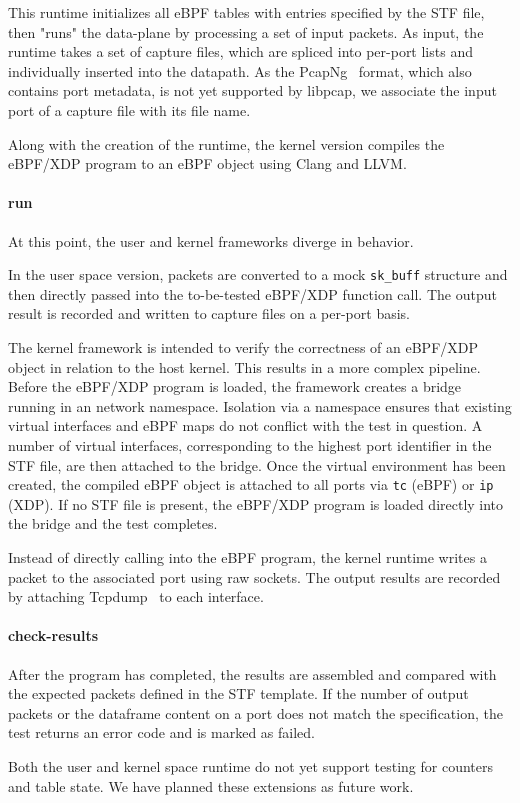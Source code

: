 This runtime initializes all eBPF tables with entries specified by the STF 
file, then "runs" the data-plane by processing a set of input packets.
As input, the runtime takes a set of capture files, which are spliced into 
per-port lists and individually inserted into the datapath.
As the PcapNg~\cite{pcapng} format, which also contains port metadata, is 
not yet supported by libpcap, we associate the input port of a capture file with
its file name.

Along with the creation of the runtime, the kernel version compiles the 
eBPF/XDP program to an eBPF object using Clang and LLVM.

\paragraph{run}
At this point, the user and kernel frameworks diverge in behavior.

In the user space version, packets are converted to a mock \texttt{sk\_buff} 
structure and then directly passed into the to-be-tested eBPF/XDP function 
call. The output result is recorded and written to capture files on a per-port 
basis.

The kernel framework is intended to verify the correctness of an 
eBPF/XDP object in relation to the host kernel. This results in a more complex 
pipeline. 
Before the eBPF/XDP program is loaded, the framework creates a bridge running 
in an network namespace. Isolation via a namespace ensures that existing 
virtual interfaces and eBPF maps do not conflict with the test in question.
A number of virtual interfaces, corresponding to the highest port identifier in 
the STF file, are then attached to the bridge.
Once the virtual environment has been created, the compiled eBPF object is 
attached to all ports via \texttt{tc} (eBPF) or \texttt{ip} (XDP). If no STF 
file is present, the eBPF/XDP program is loaded directly into the bridge and 
the test completes.

Instead of directly calling into the eBPF program, the kernel runtime writes a 
packet to the associated port using raw sockets. The output 
results are recorded by attaching Tcpdump~\cite{tcpdump} to each interface.

\paragraph{check-results}
After the program has completed, the results are assembled and compared with 
the expected packets defined in the STF template. If the number of output 
packets or the dataframe content on a port does not match the specification, 
the test returns an error code and is marked as failed.

Both the user and kernel space runtime do not yet support testing for counters 
and table state. We have planned these extensions as future work.
